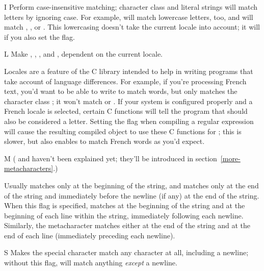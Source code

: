 \documentclass{howto}
\begin{document}
\begin{datadesc}{I}
Perform case-insensitive matching; character class and literal strings
will match
letters by ignoring case.  For example, \regexp{[A-Z]} will match
lowercase letters, too, and  will match ,
, or .
This lowercasing doesn't take the current locale into account; it will
if you also set the  flag.
\end{datadesc}

\begin{datadesc}{L}
Make , , ,
and , dependent on the current locale.  

Locales are a feature of the C library intended to help in writing
programs that take account of language differences.  For example, if
you're processing French text, you'd want to be able to write
 to match words, but  only matches the
character class \regexp{[A-Za-z]}; it won't match  or
.  If your system is configured properly and a French
locale is selected, certain C functions will tell the program that
 should also be considered a letter.  Setting the
 flag when compiling a regular expression will cause the
resulting compiled object to use these C functions for ;
this is slower, but also enables  to match French words as
you'd expect.
\end{datadesc}

\begin{datadesc}{M}
(\regexp{\^} and \regexp{\$} haven't been explained yet; 
they'll be introduced in section~\ref{more-metacharacters}.)

Usually \regexp{\^} matches only at the beginning of the string, and
\regexp{\$} matches only at the end of the string and immediately before the
newline (if any) at the end of the string. When this flag is
specified, \regexp{\^} matches at the beginning of the string and at
the beginning of each line within the string, immediately following
each newline.  Similarly, the \regexp{\$} metacharacter matches either at
the end of the string and at the end of each line (immediately
preceding each newline).

\end{datadesc}

\begin{datadesc}{S}
Makes the  special character match any character at all,
including a newline; without this flag,  will match
anything \emph{except} a newline.
\end{datadesc}
\end{document}
